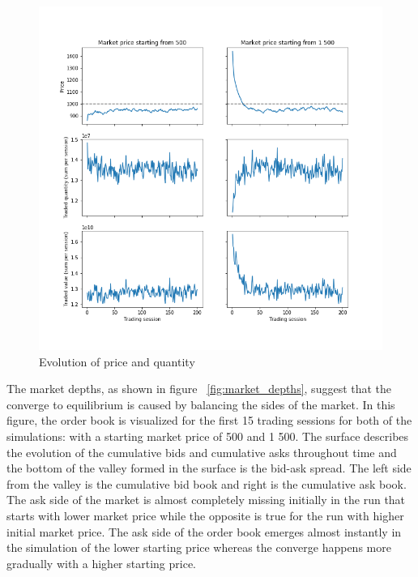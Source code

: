 \begin{figure}[H]
    \includegraphics[width=\linewidth]{plots/basic_trades.png}
    \caption{Evolution of price and quantity}
    \label{fig:basic_trades}
\end{figure}

The market depths, as shown in figure ~\ref{fig:market_depths}, suggest that the
converge to equilibrium is caused by balancing the sides of the market. 
In this figure, the order book is visualized for the first 15 trading sessions
for both of the simulations: with a starting market price of 500 and 1 500. 
The surface describes the evolution of the cumulative bids and cumulative asks 
throughout time and the bottom of the valley formed in the surface is the bid-ask spread. 
The left side from the valley is the cumulative bid book and right is the cumulative ask book. 
The ask side of the market is almost completely missing initially in the run that
starts with lower market price while the opposite is true for the run with higher
initial market price. The ask side of the order book emerges almost instantly 
in the simulation of the lower starting price whereas the converge happens more 
gradually with a higher starting price.


